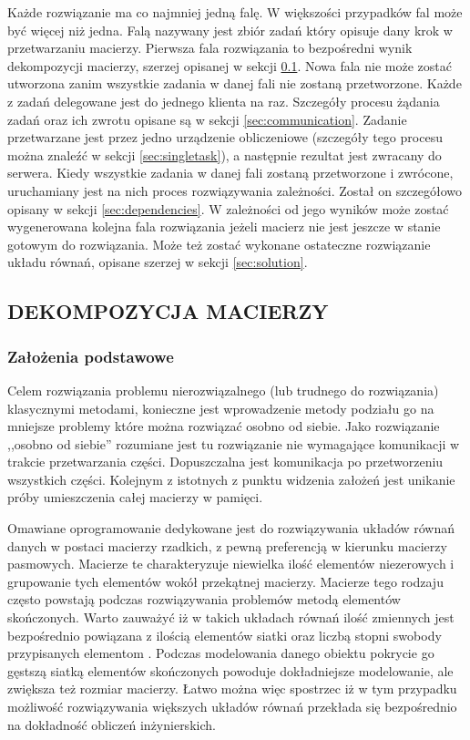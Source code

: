\documentclass[12pt,a4paper,twoside]{article}
\begin{document}
Każde rozwiązanie ma co najmniej jedną falę. W większości przypadków fal może być więcej niż jedna. Falą nazywany jest zbiór zadań który opisuje dany krok w przetwarzaniu macierzy. Pierwsza fala rozwiązania to bezpośredni wynik dekompozycji macierzy, szerzej opisanej w sekcji \ref{sec:decomposition}. Nowa fala nie może zostać utworzona zanim wszystkie zadania w danej fali nie zostaną przetworzone. Każde z zadań delegowane jest do jednego klienta na raz. Szczegóły procesu żądania zadań oraz ich zwrotu opisane są w sekcji \ref{sec:communication}. Zadanie przetwarzane jest przez jedno urządzenie obliczeniowe (szczegóły tego procesu można znaleźć w sekcji \ref{sec:singletask}), a następnie rezultat jest zwracany do serwera. Kiedy wszystkie zadania w danej fali zostaną przetworzone i zwrócone, uruchamiany jest na nich proces rozwiązywania zależności. Został on szczegółowo opisany w sekcji \ref{sec:dependencies}. W zależności od jego wyników może zostać wygenerowana kolejna fala rozwiązania jeżeli macierz nie jest jeszcze w stanie gotowym do rozwiązania. Może też zostać wykonane ostateczne rozwiązanie układu równań, opisane szerzej w sekcji \ref{sec:solution}.

\subsection{DEKOMPOZYCJA MACIERZY}
\label{sec:decomposition}

\subsubsection{Założenia podstawowe}

Celem rozwiązania problemu nierozwiązalnego (lub trudnego do rozwiązania) klasycznymi metodami, konieczne jest wprowadzenie metody podziału go na mniejsze problemy które można rozwiązać osobno od siebie. Jako rozwiązanie ,,osobno od siebie'' rozumiane jest tu rozwiązanie nie wymagające komunikacji w trakcie przetwarzania części. Dopuszczalna jest komunikacja po przetworzeniu wszystkich części. Kolejnym z istotnych z punktu widzenia założeń jest unikanie próby umieszczenia całej macierzy w pamięci.

Omawiane oprogramowanie dedykowane jest do rozwiązywania układów równań danych w postaci macierzy rzadkich, z pewną preferencją w kierunku macierzy pasmowych. Macierze te charakteryzuje niewielka ilość elementów niezerowych i grupowanie tych elementów wokół przekątnej macierzy. Macierze tego rodzaju często powstają podczas rozwiązywania problemów metodą elementów skończonych. Warto zauważyć iż w takich układach równań ilość zmiennych jest bezpośrednio powiązana z ilością elementów siatki oraz liczbą stopni swobody przypisanych elementom \cite{mes}. Podczas modelowania danego obiektu pokrycie go gęstszą siatką elementów skończonych powoduje dokładniejsze modelowanie, ale zwiększa też rozmiar macierzy. Łatwo można więc spostrzec iż w tym przypadku możliwość rozwiązywania większych układów równań przekłada się bezpośrednio na dokładność obliczeń inżynierskich.
\end{document}
